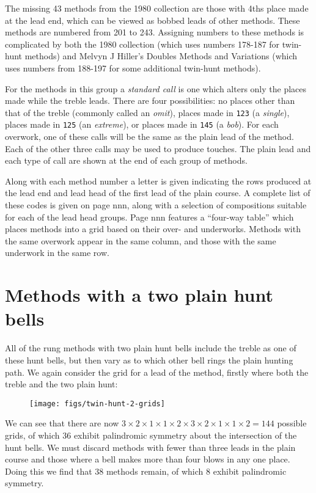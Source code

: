 The missing 43 methods from the 1980 collection are those with 4ths place made
at the lead end, which can be viewed as bobbed leads of other methods.
These methods are numbered from 201 to 243.
Assigning numbers to these methods is complicated by both the 1980 collection
(which uses numbers 178-187 for twin-hunt methods)
and Melvyn J Hiller’s Doubles Methods and Variations
(which uses numbers from 188-197 for some additional twin-hunt methods).

For the methods in this group a \emph{standard call} is one which alters only
the places made while the treble leads.
There are four possibilities:
no places other than that of the treble (commonly called an \emph{omit}),
places made in {\tt 123} (a \emph{single}),
places made in {\tt 125} (an \emph{extreme}),
or places made in {\tt 145} (a \emph{bob}).
For each overwork,
one of these calls will be the same as the plain lead of the method.
Each of the other three calls may be used to produce touches.
The plain lead and each type of call are shown at the end of each group of
methods.

Along with each method number a letter is given indicating the rows produced at
the lead end and lead head of the first lead of the plain course.
A complete list of these codes is given on page nnn,
along with a selection of compositions suitable for each of the lead head
groups.
Page nnn features a “four-way table” which places methods into a grid based on
their over- and underworks.
Methods with the same overwork appear in the same column,
and those with the same underwork in the same row.

\section{Methods with a two plain hunt bells} \label{sec:intro-double-hunt}

All of the rung methods with two plain hunt bells include the treble as one of
these hunt bells,
but then vary as to which other bell rings the plain hunting path.
We again consider the grid for a lead of the method,
firstly where both the treble and the two plain hunt:

\begin{figure}[h]
  \centering
  \texttt{[image: figs/twin-hunt-2-grids]}
\end{figure}

We can see that there are now
\(3\times2\times1\times1\times2\times3\times2\times1\times1\times 2 = 144\)
possible grids, of which 36 exhibit palindromic symmetry about the intersection
of the hunt bells.
We must discard methods with fewer than three leads in the plain course and
those where a bell makes more than four blows in any one place.
Doing this we find that 38 methods remain,
of which 8 exhibit palindromic symmetry.

